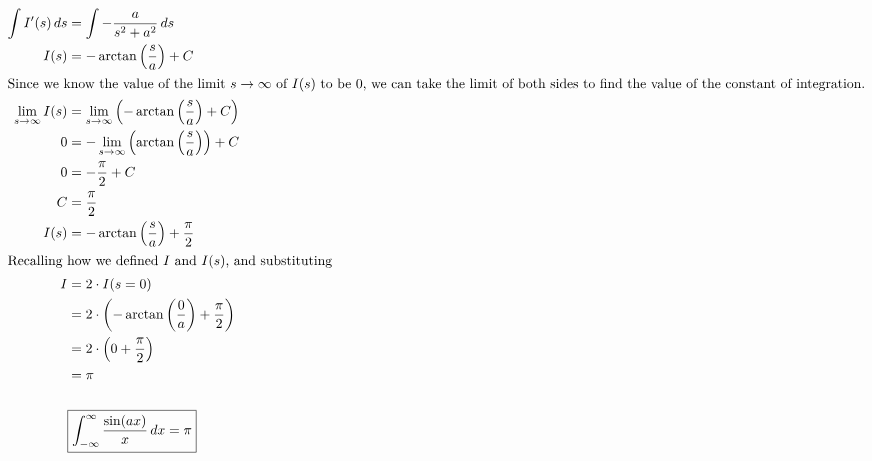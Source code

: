 \documentclass[12pt]{article}
\theoremstyle{definition}
\begin{document}
\begin{align*}
    \int I'(s) \,ds &= \int - \frac{a}{s^2 + a^2} \,ds  \\
    I(s) &= -\arctan\left(\frac{s}{a}\right) + C \\ 
    \intertext{Since we know the value of the limit $s \to \infty$ of $I(s)$ to be 0, we can take the limit of both sides to find the value of the constant of integration.}
    \lim_{s \to \infty} I(s) &= \lim_{s \to \infty} \left(-\arctan\left(\frac{s}{a}\right) + C\right) \\
    0 &= -\lim_{s \to \infty} \left(\arctan\left(\frac{s}{a}\right)\right) + C \\
    0 &= -\frac{\pi}{2} + C \\ 
    C &= \frac{\pi}{2} \\ 
    I(s) &= -\arctan\left(\frac{s}{a}\right) + \frac{\pi}{2} \\
    \intertext{Recalling how we defined $I$ and $I(s)$, and substituting}
    I &= 2 \cdot I(s = 0) \\
    &= 2 \cdot \left(-\arctan\left(\frac{0}{a}\right) + \frac{\pi}{2}\right) \\
    &= 2 \cdot \left(0 + \frac{\pi}{2}\right) \\ 
    &= \pi \\ \\
    & \boxed{\int_{-\infty}^{\infty} \frac{\sin(ax)}{x} \,dx = \pi}
\end{align*}
\end{document}
